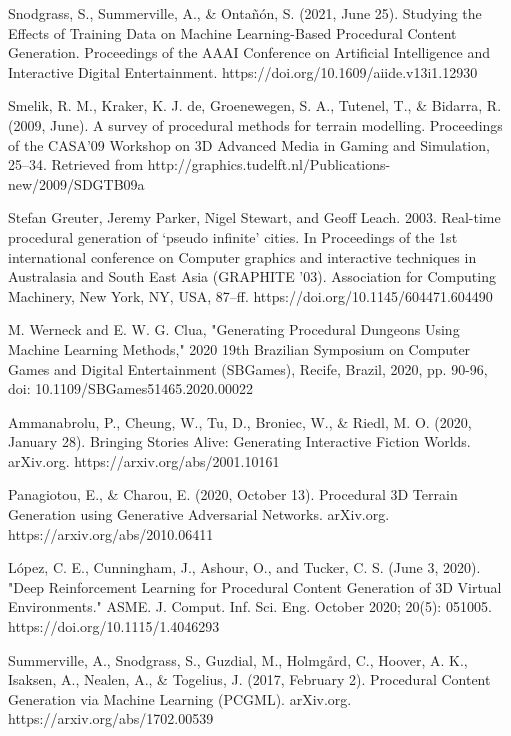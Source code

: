 \documentclass[runningheads]{llncs}
\begin{document}
\begin{thebibliography}{8}
Snodgrass, S., Summerville, A., \& Ontañón, S. (2021, June 25). Studying the Effects of Training Data on Machine Learning-Based Procedural Content Generation. Proceedings of the AAAI Conference on Artificial Intelligence and Interactive Digital Entertainment. https://doi.org/10.1609/aiide.v13i1.12930

Smelik, R. M., Kraker, K. J. de, Groenewegen, S. A., Tutenel, T., \& Bidarra, R. (2009, June). A survey of procedural methods for terrain modelling. Proceedings of the CASA’09 Workshop on 3D Advanced Media in Gaming and Simulation, 25–34. Retrieved from http://graphics.tudelft.nl/Publications-new/2009/SDGTB09a

Stefan Greuter, Jeremy Parker, Nigel Stewart, and Geoff Leach. 2003. Real-time procedural generation of `pseudo infinite' cities. In Proceedings of the 1st international conference on Computer graphics and interactive techniques in Australasia and South East Asia (GRAPHITE '03). Association for Computing Machinery, New York, NY, USA, 87–ff. https://doi.org/10.1145/604471.604490

M. Werneck and E. W. G. Clua, "Generating Procedural Dungeons Using Machine Learning Methods," 2020 19th Brazilian Symposium on Computer Games and Digital Entertainment (SBGames), Recife, Brazil, 2020, pp. 90-96, doi: 10.1109/SBGames51465.2020.00022

Ammanabrolu, P., Cheung, W., Tu, D., Broniec, W., \& Riedl, M. O. (2020, January 28). Bringing Stories Alive: Generating Interactive Fiction Worlds. arXiv.org. https://arxiv.org/abs/2001.10161

Panagiotou, E., \& Charou, E. (2020, October 13). Procedural 3D Terrain Generation using Generative Adversarial Networks. arXiv.org. https://arxiv.org/abs/2010.06411

López, C. E., Cunningham, J., Ashour, O., and Tucker, C. S. (June 3, 2020). "Deep Reinforcement Learning for Procedural Content Generation of 3D Virtual Environments." ASME. J. Comput. Inf. Sci. Eng. October 2020; 20(5): 051005. https://doi.org/10.1115/1.4046293

Summerville, A., Snodgrass, S., Guzdial, M., Holmgård, C., Hoover, A. K., Isaksen, A., Nealen, A., \& Togelius, J. (2017, February 2). Procedural Content Generation via Machine Learning (PCGML). arXiv.org. https://arxiv.org/abs/1702.00539


\end{thebibliography}
\end{document}
